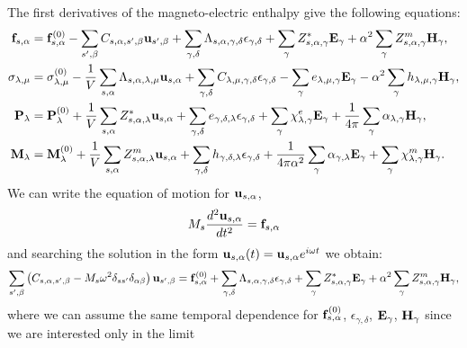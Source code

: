\documentclass[12pt,a4paper,twoside]{report}
\begin{document}
{\color{web-blue}
The first derivatives of the magneto-electric enthalpy give the following equations:
\begin{align}
{\bf f}_{s,\alpha}&= {\bf f}^{(0)}_{s,\alpha}
-\sum_{s',\beta} C_{s,\alpha,s',\beta} {\bf u}_{s',\beta}
+\sum_{\gamma,\delta}
\Lambda_{s,\alpha,\gamma,\delta} 
\epsilon_{\gamma,\delta} +
\sum_{\gamma} Z^*_{s,\alpha,\gamma} {\bf E}_{\gamma}
+\alpha^2 \sum_{\gamma} 
Z^m_{s,\alpha,\gamma} {\bf H}_{\gamma}, \\
\sigma_{\lambda,\mu}&= \sigma_{\lambda,\mu}^{(0)}
-{1\over V} \sum_{s,\alpha}
\Lambda_{s,\alpha,\lambda,\mu} {\bf u}_{s,\alpha}
+\sum_{\gamma,\delta} C_{\lambda,\mu,\gamma,\delta}  
\epsilon_{\gamma,\delta} -
\sum_{\gamma} e_{\lambda,\mu,\gamma} 
 {\bf E}_{\gamma}
-\alpha^2 \sum_{\gamma}  h_{\lambda,\mu,\gamma} 
{\bf H}_{\gamma}, \\
{\bf P}_{\lambda}&= {\bf P}^{(0)}_{\lambda}
+{1\over V} \sum_{s,\alpha} Z^*_{s,\alpha,\lambda} 
{\bf u}_{s,\alpha} +
\sum_{\gamma,\delta} e_{\gamma,\delta,\lambda} 
\epsilon_{\gamma,\delta} +
\sum_{\gamma} 
\chi^e_{\lambda,\gamma}
{\bf E}_{\gamma} +
{1\over 4 \pi}\sum_{\gamma} \alpha_{\lambda,\gamma} 
{\bf H}_{\gamma}, \\
{\bf M}_{\lambda}&= {\bf M}^{(0)}_{\lambda}
+{1\over V}\sum_{s,\alpha} 
Z^m_{s,\alpha,\lambda} {\bf u}_{s,\alpha} +
\sum_{\gamma,\delta}  h_{\gamma,\delta,\lambda} 
\epsilon_{\gamma,\delta} 
+{1\over 4 \pi \alpha^2} 
\sum_{\gamma} \alpha_{\gamma,\lambda} {\bf E}_{\gamma}
+\sum_{\gamma} 
\chi^m_{\lambda,\gamma}
{\bf H}_{\gamma}.
\end{align}
We can write the equation of motion for ${\bf u}_{s,\alpha}$,
\begin{equation}
M_s {d^2 {\bf u}_{s,\alpha} \over d t^2} = {\bf f}_{s,\alpha}
\end{equation}
and searching the solution in the form ${\bf u}_{s,\alpha}(t)=
{\bf u}_{s,\alpha} e^{i\omega t}$ we obtain:
\begin{equation}
\sum_{s',\beta} \left(C_{s,\alpha,s',\beta} - 
M_s \omega^2 \delta_{ss'}\delta_{\alpha\beta}\right)
{\bf u}_{s',\beta}= {\bf f}^{(0)}_{s,\alpha} + \sum_{\gamma,\delta} 
\Lambda_{s,\alpha,\gamma,\delta} \epsilon_{\gamma,\delta}
+ \sum_{\gamma} Z^*_{s,\alpha,\gamma} {\bf E}_{\gamma} 
+ \alpha^2 \sum_{\gamma} Z^m_{s,\alpha,\gamma} 
{\bf H}_{\gamma},
\end{equation}
where we can assume the same temporal dependence for
${\bf f}^{(0)}_{s,\alpha}$, $\epsilon_{\gamma,\delta}$,
${\bf E}_{\gamma}$,
${\bf H}_{\gamma}$ since we are interested only in the limit
}
\end{document}
